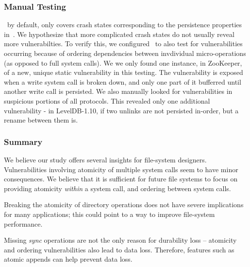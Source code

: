 \subsubsection{Manual Testing}


\toolname\, by default, only covers crash states corresponding to the
persistence properties in~. We hypothesize that more
complicated crash states do not usually reveal more vulnerabilties. To verify
this, we configured \toolname\ to also test for vulnerabilities occurring
because of ordering dependencies between invdividual micro-operations (as
opposed to full system calls). We we only found one instance, in ZooKeeper, of
a new, unique static vulnerability in this testing. The vulnerability is
exposed when a write system call is broken down, and only one part of it
bufferred until another write call is persisted. We also manually looked for
vulnerabilities in suspicious portions of all protocols. This revealed only one
additional vulnerability - in LevelDB-1.10, if two unlinks are not persisted
in-order, but a rename between them is.

\fi

\subsubsection{Summary} 

We believe our study offers several insights for file-system
designers. Vulnerabilities involving atomicity of multiple system calls seem to have minor
consequences. We believe that it is sufficient for future file systems to focus
on providing atomicity \textit{within} a system call, and ordering between
system calls. 

Breaking the atomicity of directory operations does not have severe
implications for many applications; this could point to a way to improve
file-system performance. 

Missing \textit{sync} operations are not the only reason for
durability loss -- atomicity and ordering vulnerabilities also lead to data
loss.  Therefore, features such as atomic appends can help prevent data loss.

